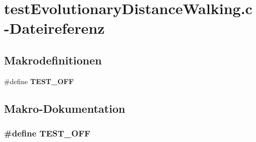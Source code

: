 \section{testEvolutionaryDistanceWalking.c-\/Dateireferenz}
\label{test_evolutionary_distance_walking_8c}
\subsection*{Makrodefinitionen}
\begin{DoxyCompactItemize}
\item 
\#define {\bf TEST\_\-OFF}
\end{DoxyCompactItemize}


\subsection{Makro-\/Dokumentation}
\subsubsection[{TEST\_\-OFF}]{\setlength{\rightskip}{0pt plus 5cm}\#define TEST\_\-OFF}\label{test_evolutionary_distance_walking_8c_a8f6764e8e57eabbb14922404c0e25175}
